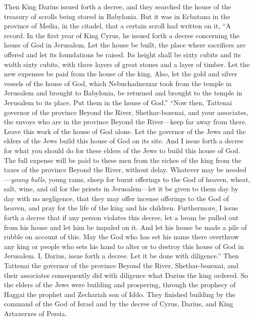 \begin{biblechapter} %
 Then King Darius issued forth a decree, and they searched the house of the treasury of scrolls being stored in Babylonia.
\verse But it was in Ecbatana in the province of Media, in the citadel, that a certain scroll had written on it, “A record.
\verse In the first year of King Cyrus, he issued forth a decree concerning the house of God in Jerusalem. Let the house be built, the place where sacrifices are offered and let its foundations be raised. Its height shall be sixty cubits and its width sixty cubits,
\verse with three layers of great stones and a layer of timber. Let the new expenses be paid from the house of the king.
\verse Also, let the gold and silver vessels of the house of God, which Nebuchadnezzar took from the temple in Jerusalem and brought to Babylonia, be returned and brought to the temple in Jerusalem to its place. Put them in the house of God.”
 “Now then, Tattenai governor of the province Beyond the River, Shethar-bozenai, and your associates, the envoys who are in the province Beyond the River—keep far away from there.
\verse Leave this work of the house of God alone. Let the governor of the Jews and the elders of the Jews build this house of God on its site.
\verse And I issue forth a decree for what you should do for these elders of the Jews to build this house of God. The full expense will be paid to these men from the riches of the king from the taxes of the province Beyond the River, without delay.
\verse Whatever may be needed—\textit{young bulls}, young rams, sheep for burnt offerings to the God of heaven, wheat, salt, wine, and oil for the priests in Jerusalem—let it be given to them day by day with no negligence,
\verse that they may offer incense offerings to the God of heaven, and pray for the life of the king and his children.
\verse Furthermore, I issue forth a decree that if any person violates this decree, let a beam be pulled out from his house and let him be impaled on it. And let his house be made a pile of rubble on account of this.
\verse May the God who has set his name there overthrow any king or people who sets his hand to alter or to destroy this house of God in Jerusalem. I, Darius, issue forth a decree. Let it be done with diligence.”
 Then Tattenai the governor of the province Beyond the River, Shethar-bozenai, and their associates consequently did with diligence what Darius the king ordered.
\verse So the elders of the Jews were building and prospering, through the prophecy of Haggai the prophet and Zechariah son of Iddo. They finished building by the command of the God of Israel and by the decree of Cyrus, Darius, and King Artaxerxes of Persia.

\end{biblechapter}
